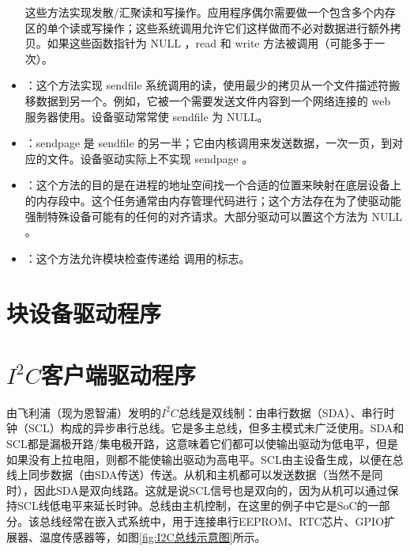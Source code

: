 \documentclass[lang=cn,newtx,10pt,scheme=chinese]{elegantbook}
\begin{document}
\begin{itemize}
这些方法实现发散/汇聚读和写操作。应用程序偶尔需要做一个包含多个内存区的单个读或写操作；这些系统调用允许它们这样做而不必对数据进行额外拷贝。如果这些函数指针为 NULL ，read 和 write 方法被调用（可能多于一次）。
    \item {}：这个方法实现 sendfile 系统调用的读，使用最少的拷贝从一个文件描述符搬移数据到另一个。例如，它被一个需要发送文件内容到一个网络连接的 web 服务器使用。设备驱动常常使 sendfile 为 NULL。
    \item {}：sendpage 是 sendfile 的另一半；它由内核调用来发送数据，一次一页，到对应的文件。设备驱动实际上不实现 sendpage 。
    \item {}：这个方法的目的是在进程的地址空间找一个合适的位置来映射在底层设备上的内存段中。这个任务通常由内存管理代码进行；这个方法存在为了使驱动能强制特殊设备可能有的任何的对齐请求。大部分驱动可以置这个方法为 NULL 。
    \item {}：这个方法允许模块检查传递给  调用的标志。
\end{itemize}

\chapter{块设备驱动程序}

\chapter{\texorpdfstring{$I^2C$客户端驱动程序}{I2C客户端驱动程序}}

由飞利浦（现为恩智浦）发明的$I^2C$总线是双线制：由串行数据（SDA）、串行时钟（SCL）构成的异步串行总线。它是多主总线，但多主模式未广泛使用。SDA和SCL都是漏极开路/集电极开路，这意味着它们都可以使输出驱动为低电平，但是如果没有上拉电阻，则都不能使输出驱动为高电平。SCL由主设备生成，以便在总线上同步数据（由SDA传送）传送。从机和主机都可以发送数据（当然不是同时），因此SDA是双向线路。这就是说SCL信号也是双向的，因为从机可以通过保持SCL线低电平来延长时钟。总线由主机控制，在这里的例子中它是SoC的一部分。该总线经常在嵌入式系统中，用于连接串行EEPROM、RTC芯片、GPIO扩展器、温度传感器等，如图\ref{fig:I2C总线示意图}所示。
\end{document}
